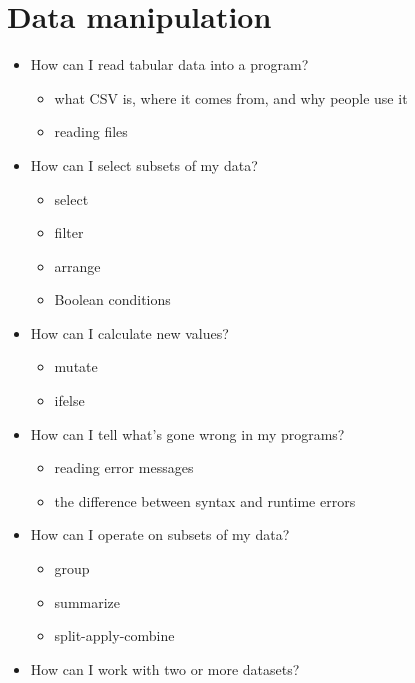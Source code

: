 \documentclass[]{Nemilov}
\providecommand{\tightlist}{%
  \setlength{\itemsep}{0pt}\setlength{\parskip}{0pt}}
\begin{document}
\hypertarget{data-manipulation}{%
\section{Data manipulation}\label{data-manipulation}}

\begin{itemize}
\tightlist
\item
  How can I read tabular data into a program?

  \begin{itemize}
  \tightlist
  \item
    what CSV is, where it comes from, and why people use it
  \item
    reading files
  \end{itemize}
\item
  How can I select subsets of my data?

  \begin{itemize}
  \tightlist
  \item
    select
  \item
    filter
  \item
    arrange
  \item
    Boolean conditions
  \end{itemize}
\item
  How can I calculate new values?

  \begin{itemize}
  \tightlist
  \item
    mutate
  \item
    ifelse
  \end{itemize}
\item
  How can I tell what's gone wrong in my programs?

  \begin{itemize}
  \tightlist
  \item
    reading error messages
  \item
    the difference between syntax and runtime errors
  \end{itemize}
\item
  How can I operate on subsets of my data?

  \begin{itemize}
  \tightlist
  \item
    group
  \item
    summarize
  \item
    split-apply-combine
  \end{itemize}
\item
  How can I work with two or more datasets?


\end{itemize}
\end{document}
